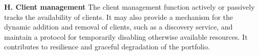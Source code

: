 \textbf{H. Client management}
The client management function actively or passively tracks the availability of clients. It may also provide a mechanism for the dynamic addition and removal of clients, such as a discovery service, and maintain a protocol for temporarily disabling otherwise available resources. It contributes to resilience and graceful degradation of the portfolio.


